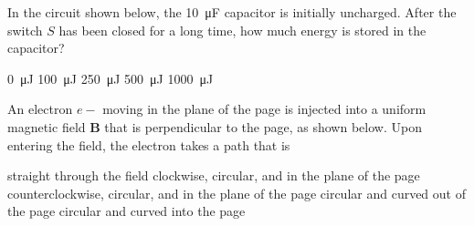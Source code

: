 \documentclass[12pt]{../../oss-classkick-exam}
\begin{document}
\begin{questions}
  \question In the circuit shown below, the \SI{10}{\micro\farad} capacitor is
  initially uncharged. After the switch $S$ has been closed for a long time,
  how much energy is stored in the capacitor?
  
  \begin{minipage}{.4\linewidth}
  \end{minipage}
  \begin{minipage}{.54\linewidth}
    \begin{choices}
      \choice\SI{0}{\micro\joule}
      \choice\SI{100}{\micro\joule}
      \choice\SI{250}{\micro\joule}
      \choice\SI{500}{\micro\joule}
      \choice\SI{1000}{\micro\joule}
    \end{choices}
  \end{minipage}

  \uplevel{ \rule{\linewidth}{.5pt}}
  
  \question An electron $e-$ moving in the plane of the page is injected into a
  uniform magnetic field $\bm{B}$ that is perpendicular to the page, as shown
  below. Upon entering the field, the electron takes a path that is

  \vspace{.1in}
  \begin{minipage}{.4\linewidth}
  \end{minipage}
  \begin{minipage}{.55\linewidth}
    \begin{choices}
      \choice straight through the field
      \choice clockwise, circular, and in the plane of the page
      \choice counterclockwise, circular, and in the plane of the page
      \choice circular and curved out of the page
      \choice circular and curved into the page
    \end{choices}
  \end{minipage}
  

\end{questions}
\end{document}
